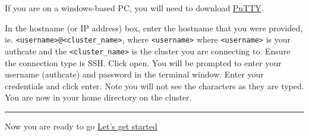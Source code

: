\documentclass[
]{book}
\begin{document}
If you are on a windows-based PC, you will need to download \href{https://www.putty.org/}{PuTTY}.

In the hostname (or IP address) box, enter the hostname that you were provided, ie. \texttt{\textless{}username\textgreater{}@\textless{}cluster\_name\textgreater{}}, where \texttt{\textless{}username\textgreater{}} where \texttt{\textless{}username\textgreater{}} is your authcate and the \texttt{\textless{}cluster\_name\textgreater{}} is the cluster you are connecting to. Ensure the connection type is SSH. Click open. You will be prompted to enter your username (authcate) and password in the terminal window. Enter your credentials and click enter. Note you will not see the characters as they are typed. You are now in your home directory on the cluster.

\begin{center}\rule{0.5\linewidth}{0.5pt}\end{center}

Now you are ready to go
{\href{introduction.html}{Let's get started}}
\end{document}
